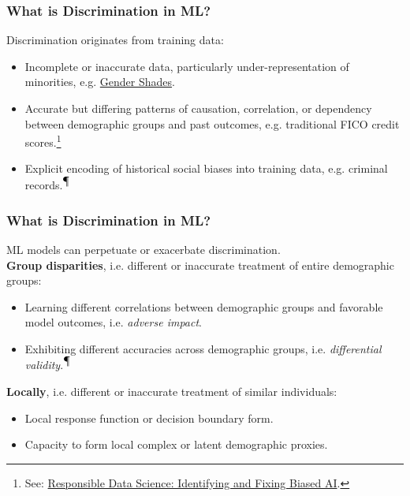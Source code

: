 \documentclass[11pt,
               		aspectratio=169,
               		hyperref={colorlinks}
               		]{beamer}
\begin{document}
		\begin{frame}				
			\frametitle{What is Discrimination in ML?}
			\noindent Discrimination originates from training data:\\
			\begin{itemize}
				\item Incomplete or inaccurate data, particularly under-representation of minorities, e.g. \href{http://gendershades.org/}{Gender Shades}\cite{gender_shades}.
				\item Accurate but differing patterns of causation, correlation, or dependency between demographic groups and past outcomes, e.g. traditional FICO credit scores.\footnote{\scriptsize{See: \href{https://www.youtube.com/watch?v=rToFuhI6Nlw}{Responsible Data Science: Identifying and Fixing Biased AI}.}}
				\item Explicit encoding of historical social biases into training data, e.g. criminal records.\textsuperscript{$\mathparagraph$}
			\end{itemize}
		\end{frame}
		\begin{frame}				
			\frametitle{What is Discrimination in ML?}
			ML models can perpetuate or exacerbate discrimination.\\
			\vspace{10pt}
			\noindent \textbf{Group disparities}, i.e. different or inaccurate treatment of entire demographic groups:\\
			\begin{itemize}
				\item Learning different correlations between demographic groups and favorable model outcomes, i.e. \textit{adverse impact}.
				\item Exhibiting different accuracies across demographic groups, i.e. \textit{differential validity}.\textsuperscript{$\mathparagraph$}
			\end{itemize}
			\vspace{5pt}
			\noindent \textbf{Locally}, i.e. different or inaccurate treatment of similar individuals:\\
			\begin{itemize}
				\item Local response function or decision boundary form. 
				\item Capacity to form local complex or latent demographic proxies.
			\end{itemize}
		\end{frame}
\end{document}
